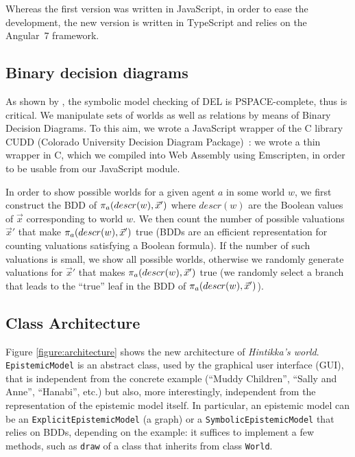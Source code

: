 
Whereas the first version was written in JavaScript, in order to ease the development, the new version is written in TypeScript and relies on the Angular~7 framework.

\subsection{Binary decision diagrams}

As shown by \citet{DBLP:conf/atal/CharrierS17}, the symbolic model checking of DEL is PSPACE-complete, thus is critical. We manipulate sets of worlds as well as relations by means of Binary Decision Diagrams. To this aim, we wrote a JavaScript wrapper of the C library CUDD (Colorado University Decision Diagram Package)~\cite{DBLP:journals/sttt/Somenzi01}: we wrote a thin wrapper in C, which we compiled into Web Assembly using Emscripten, in order to be usable from our JavaScript module.

In order to show possible worlds for a given agent $a$ in some world $w$, we first construct the BDD of $\pi_{a}(descr(w), \vec x')$ where $descr(w)$ are the Boolean values of $\vec x$ corresponding to world $w$. We then count the number of possible valuations $\vec x'$ that make $\pi_{a}(descr(w), \vec x')$ true (BDDs are an efficient representation for counting valuations satisfying a Boolean formula). If the number of such valuations is small, we show all possible worlds, otherwise we randomly generate valuations for $\vec x'$ that makes $\pi_{a}(descr(w), \vec x')$ true (we randomly select a branch that leads to the ``true'' leaf in the BDD of $\pi_{a}(descr(w), \vec x')$).

\subsection{Class Architecture}

Figure \ref{figure:architecture} shows the new architecture of \emph{Hintikka's world}. \texttt{EpistemicModel} is an abstract class, used by the graphical user interface (GUI), that is independent from the concrete example (``Muddy Children'', ``Sally and Anne'', ``Hanabi'', etc.) but also, more interestingly, independent from the representation of the epistemic model itself. In particular, an epistemic model can be an \texttt{ExplicitEpistemicModel} (a graph) or a \texttt{SymbolicEpistemicModel} that relies on BDDs, depending on the example: it suffices to implement a few methods, such as \texttt{draw} of a class that inherits from class \texttt{World}.


